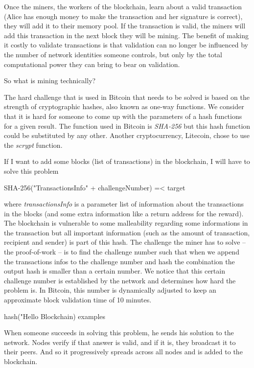 \documentclass{vldb}
\begin{document}
Once the miners, the workers of the blockchain, learn about a  valid transaction (Alice has enough money to make the transaction and her signature is correct), they will add it to their memory pool. If the transaction is valid, the miners will add this transaction in the next block they will be mining. The benefit of making it costly to validate transactions is that validation can no longer be influenced by the number of network identities someone controls, but only by the total computational power they can bring to bear on validation.

So what is mining technically?

The hard challenge that is used in Bitcoin that needs to be solved is based on the strength of cryptographic hashes, also known as one-way functions. We consider that it is hard for someone to come up with the parameters of a hash functions for a given result. The function used in Bitcoin is \emph{SHA-256} but this hash function could be substituted by any other. Another cryptocurrency, Litecoin, chose to use the \emph{scrypt} function.

If I want to add some blocks (list of transactions) in the blockchain, I will have to solve this problem

SHA-256("TransactionsInfo" + challengeNumber) =< target

where \emph{transactionsInfo} is a parameter list of information about the transactions in the blocks (and some extra information like a return address for the reward). The blockchain is vulnerable to some malleability regarding some informations in the transaction but all important information (such as the amount of transaction, recipient and sender) is part of this hash.
The challenge the miner has to solve – the proof-of-work – is to find the challenge number such that when we append the transactions infos to the challenge number and hash the combination the output hash is smaller than a certain number.
We notice that this certain challenge number is established by the network and determines how hard the problem is. In Bitcoin, this number is dynamically adjusted to keep an approximate block validation time of 10 minutes.\cite{hashCash}

hash("Hello Blockchain) examples

When someone succeeds in solving this problem, he sends his solution to the network. Nodes verify if that answer is valid, and if it is, they broadcast it to their peers. And so it progressively spreads across all nodes and is added to the blockchain. 
\end{document}
